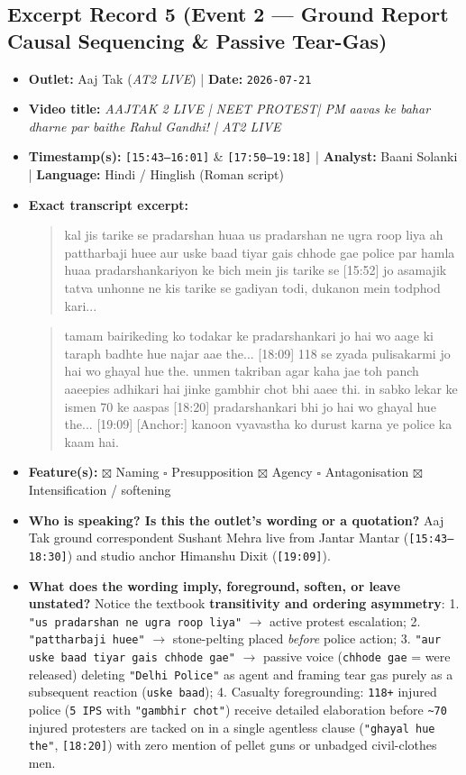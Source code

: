 \documentclass[10pt,a4paper]{article}
\begin{document}
\subsection*{Excerpt Record 5 (Event 2 --- Ground Report Causal Sequencing \& Passive Tear-Gas)}
\begin{itemize}[leftmargin=1.5em, itemsep=3pt, topsep=4pt]
  \item \textbf{Outlet:} Aaj Tak (\textit{AT2 LIVE}) | \textbf{Date:} \texttt{2026-07-21}
  \item \textbf{Video title:} \textit{AAJTAK 2 LIVE | NEET PROTEST| PM aavas ke bahar dharne par baithe Rahul Gandhi! | AT2 LIVE}
  \item \textbf{Timestamp(s):} \texttt{[15:43--16:01]} \& \texttt{[17:50--19:18]} | \textbf{Analyst:} Baani Solanki | \textbf{Language:} Hindi / Hinglish (Roman script)
  \item \textbf{Exact transcript excerpt:}
    \begin{quote}\small{} kal jis tarike se pradarshan huaa us pradarshan ne ugra roop liya ah pattharbaji huee aur uske baad tiyar gais chhode gae police par hamla huaa pradarshankariyon ke bich mein jis tarike se [15:52] jo asamajik tatva unhonne ne kis tarike se gadiyan todi, dukanon mein todphod kari...\end{quote}
    \begin{quote}\small\ttfamily [17:50] tamam bairikeding ko todakar ke pradarshankari jo hai wo aage ki taraph badhte hue najar aae the... [18:09] 118 se zyada pulisakarmi jo hai wo ghayal hue the. unmen takriban agar kaha jae toh panch aaeepies adhikari hai jinke gambhir chot bhi aaee thi. in sabko lekar ke ismen 70 ke aaspas [18:20] pradarshankari bhi jo hai wo ghayal hue the... [19:09] [Anchor:] kanoon vyavastha ko durust karna ye police ka kaam hai.\end{quote}
  \item \textbf{Feature(s):} $\boxtimes$ Naming $\square$ Presupposition $\boxtimes$ Agency $\square$ Antagonisation $\boxtimes$ Intensification / softening
  \item \textbf{Who is speaking? Is this the outlet's wording or a quotation?} Aaj Tak ground correspondent Sushant Mehra live from Jantar Mantar (\texttt{[15:43--18:30]}) and studio anchor Himanshu Dixit (\texttt{[19:09]}).
  \item \textbf{What does the wording imply, foreground, soften, or leave unstated?} Notice the textbook \textbf{transitivity and ordering asymmetry}: 1. \texttt{"us pradarshan ne ugra roop liya"} $\rightarrow$ active protest escalation; 2. \texttt{"pattharbaji huee"} $\rightarrow$ stone-pelting placed \textit{before} police action; 3. \texttt{"aur uske baad tiyar gais chhode gae"} $\rightarrow$ passive voice (\texttt{chhode gae} = were released) deleting \texttt{"Delhi Police"} as agent and framing tear gas purely as a subsequent reaction (\texttt{uske baad}); 4. Casualty foregrounding: \texttt{118+} injured police (\texttt{5 IPS} with \texttt{"gambhir chot"}) receive detailed elaboration before \texttt{\textasciitilde{}70} injured protesters are tacked on in a single agentless clause (\texttt{"ghayal hue the"}, \texttt{[18:20]}) with zero mention of pellet guns or unbadged civil-clothes men.

\end{itemize}
\end{document}
